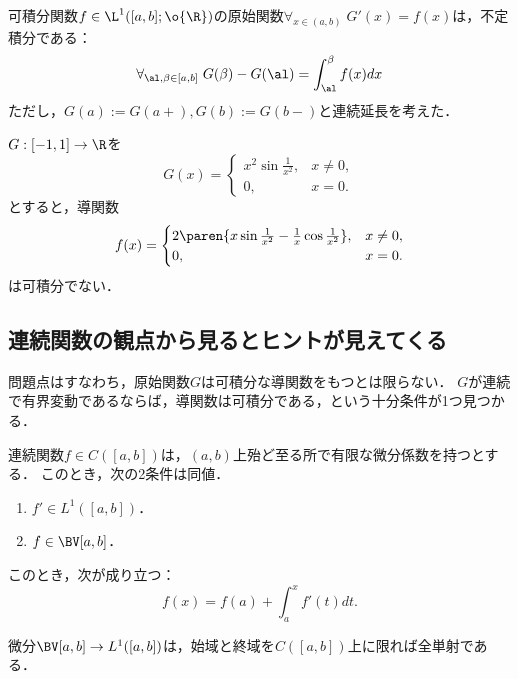 \documentclass[uplatex, dvipdfmx]{jsreport}
\begin{document}
\begin{theorem}
    可積分関数$f\in\L^1([a,b];\o{\R})$の原始関数$\forall_{x\in (a,b)}\;G'(x)=f(x)$は，不定積分である：
    \[\forall_{\al,\beta\in[a,b]}\;G(\beta)-G(\al)=\int^\beta_\al f(x)dx\]
    ただし，$G(a):=G(a+),G(b):=G(b-)$と連続延長を考えた．
\end{theorem}

\begin{example}
    $G:[-1,1]\to\R$を
    \[G(x)=\begin{cases}
        x^2\sin\frac{1}{x^2},&x\ne0,\\
        0,&x=0.
    \end{cases}\]
    とすると，導関数
    \[f(x)=\begin{cases}
        2\paren{x\sin\frac{1}{x^2}-\frac{1}{x}\cos\frac{1}{x^2}},&x\ne0,\\
        0,&x=0.
    \end{cases}\]
    は可積分でない．
\end{example}

\subsection{連続関数の観点から見るとヒントが見えてくる}

\begin{tcolorbox}[colframe=ForestGreen, colback=ForestGreen!10!white,breakable,colbacktitle=ForestGreen!40!white,coltitle=black,fonttitle=\bfseries\sffamily,
title=]
    問題点はすなわち，原始関数$G$は可積分な導関数をもつとは限らない．
    $G$が連続で有界変動であるならば，導関数は可積分である，という十分条件が1つ見つかる．
\end{tcolorbox}

\begin{theorem}\label{thm-Lebesgue-BV-and-L1}
    連続関数$f\in C([a,b])$は，$(a,b)$上殆ど至る所で有限な微分係数を持つとする．
    このとき，次の2条件は同値．
    \begin{enumerate}
        \item $f'\in L^1([a,b])$．
        \item $f\in\BV[a,b]$．
    \end{enumerate}
    このとき，次が成り立つ：
    \[f(x)=f(a)+\int^x_af'(t)dt.\]
\end{theorem}
\begin{remarks}
    微分$\BV[a,b]\to L^1([a,b])$は，始域と終域を$C([a,b])$上に限れば全単射である．
\end{remarks}
\end{document}
